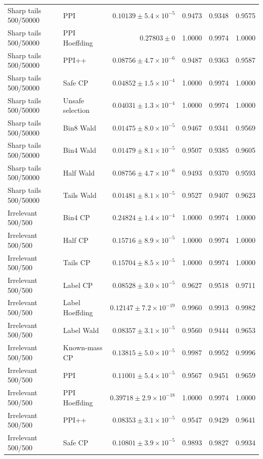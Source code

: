 \begin{longtable}{llrrrr}
Sharp tails 500/50000 & PPI & $0.10139\pm 5.4\times 10^{-5}$ & 0.9473 & 0.9348 & 0.9575 \\
Sharp tails 500/50000 & PPI Hoeffding & $0.27803\pm 0$ & 1.0000 & 0.9974 & 1.0000 \\
Sharp tails 500/50000 & PPI++ & $0.08756\pm 4.7\times 10^{-6}$ & 0.9487 & 0.9363 & 0.9587 \\
Sharp tails 500/50000 & Safe CP & $0.04852\pm 1.5\times 10^{-4}$ & 1.0000 & 0.9974 & 1.0000 \\
Sharp tails 500/50000 & Unsafe selection & $0.04031\pm 1.3\times 10^{-4}$ & 1.0000 & 0.9974 & 1.0000 \\
Sharp tails 500/50000 & Bin8 Wald & $0.01475\pm 8.0\times 10^{-5}$ & 0.9467 & 0.9341 & 0.9569 \\
Sharp tails 500/50000 & Bin4 Wald & $0.01479\pm 8.1\times 10^{-5}$ & 0.9507 & 0.9385 & 0.9605 \\
Sharp tails 500/50000 & Half Wald & $0.08756\pm 4.7\times 10^{-6}$ & 0.9493 & 0.9370 & 0.9593 \\
Sharp tails 500/50000 & Tails Wald & $0.01481\pm 8.1\times 10^{-5}$ & 0.9527 & 0.9407 & 0.9623 \\
Irrelevant 500/500 & Bin4 CP & $0.24824\pm 1.4\times 10^{-4}$ & 1.0000 & 0.9974 & 1.0000 \\
Irrelevant 500/500 & Half CP & $0.15716\pm 8.9\times 10^{-5}$ & 1.0000 & 0.9974 & 1.0000 \\
Irrelevant 500/500 & Tails CP & $0.15704\pm 8.5\times 10^{-5}$ & 1.0000 & 0.9974 & 1.0000 \\
Irrelevant 500/500 & Label CP & $0.08528\pm 3.0\times 10^{-5}$ & 0.9627 & 0.9518 & 0.9711 \\
Irrelevant 500/500 & Label Hoeffding & $0.12147\pm 7.2\times 10^{-19}$ & 0.9960 & 0.9913 & 0.9982 \\
Irrelevant 500/500 & Label Wald & $0.08357\pm 3.1\times 10^{-5}$ & 0.9560 & 0.9444 & 0.9653 \\
Irrelevant 500/500 & Known-mass CP & $0.13815\pm 5.0\times 10^{-5}$ & 0.9987 & 0.9952 & 0.9996 \\
Irrelevant 500/500 & PPI & $0.11001\pm 5.4\times 10^{-5}$ & 0.9567 & 0.9451 & 0.9659 \\
Irrelevant 500/500 & PPI Hoeffding & $0.39718\pm 2.9\times 10^{-18}$ & 1.0000 & 0.9974 & 1.0000 \\
Irrelevant 500/500 & PPI++ & $0.08353\pm 3.1\times 10^{-5}$ & 0.9547 & 0.9429 & 0.9641 \\
Irrelevant 500/500 & Safe CP & $0.10801\pm 3.9\times 10^{-5}$ & 0.9893 & 0.9827 & 0.9934 \\

\end{longtable}
